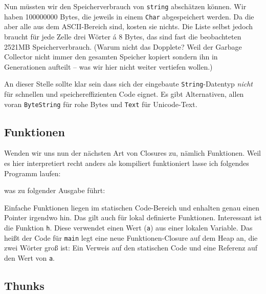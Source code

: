 \documentclass[11pt,DIV=12,parskip=half,headings=normal,abstract]{scrartcl}
\newcommand{\li}{\lstinline[style=haskell]}
\begin{document}
Nun müssten wir den Speicherverbrauch von \li-string- abschätzen können. Wir haben 100000000 Bytes, die jeweils in einem \li-Char- abgespeichert werden. Da die aber alle aus dem ASCII-Bereich sind, kosten sie nichts. Die Liste selbst jedoch braucht für jede Zelle drei Wörter á 8 Bytes, das sind fast die beobachteten 2521MB Speicherverbrauch. (Warum nicht das Dopplete? Weil der Garbage Collector nicht immer den gesamten Speicher kopiert sondern ihn in Generationen aufteilt – was wir hier nicht weiter vertiefen wollen.)

An dieser Stelle sollte klar sein dass sich der eingebaute \li-String--Datentyp \emph{nicht} für schnellen und speichereffizienten Code eignet. Es gibt Alternativen, allen voran \li-ByteString- für rohe Bytes und \li-Text- für Unicode-Text.

\subsection{Funktionen}

Wenden wir uns nun der nächsten Art von Closures zu, nämlich Funktionen. Weil es hier interpretiert recht anders als kompiliert funktioniert lasse ich folgendes Programm laufen:


was zu folgender Ausgabe führt:

Einfache Funktionen liegen im statischen Code-Bereich und enhalten genau einen Pointer irgendwo hin. Das gilt auch für lokal definierte Funktionen. Interessant ist die Funktion \li-h-. Diese verwendet einen Wert (\li-a-) aus einer lokalen Variable. Das heißt der Code für \li-main- legt eine neue Funktionen-Closure auf dem Heap an, die zwei Wörter groß ist: Ein Verweis auf den statischen Code und eine Referenz auf den Wert von \li-a-. 

\subsection{Thunks}
\end{document}
